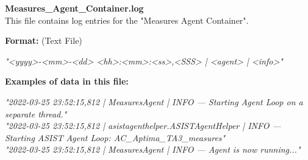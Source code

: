 \begin{description}
\begin{addmargin}[0em]{0em}
    \label{Measures_Agent_Container.log}
    \begin{addmargin}[1em]{0em} %
        \textbf{Measures\_Agent\_Container.log}\\
        This file contains log entries for the "Measures Agent Container".
        \begin{addmargin}[1em]{0em}
            \textbf{Format:} (Text File)
            \begin{addmargin}[1em]{0em}
                \textit{"<yyyy>-<mm>-<dd> <hh>:<mm>:<ss>,<SSS> | <agent> | <info>"}
            \end{addmargin}
        \end{addmargin}
        \begin{addmargin}[1em]{0em}
            \textbf{Examples of data in this file:}
            \begin{addmargin}[1em]{0em}\textit{"2022-03-25 23:52:15,812 | MeasuresAgent | INFO — Starting Agent Loop on a separate thread."\\
                "2022-03-25 23:52:15,812 | asistagenthelper.ASISTAgentHelper | INFO — Starting ASIST Agent Loop: AC\_Aptima\_TA3\_measures"\\
                "2022-03-25 23:52:15,812 | MeasuresAgent | INFO — Agent is now running..."}
            \end{addmargin}
        \end{addmargin}
    \end{addmargin} %
    \textbf{\\}


\end{addmargin}
\end{description}
